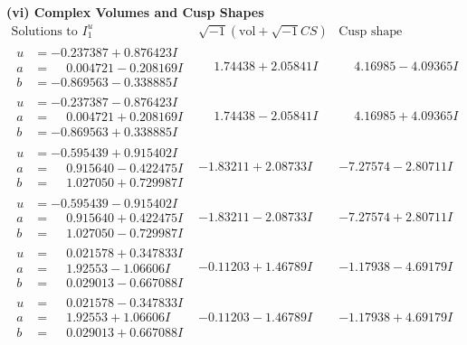 \documentclass[1p]{elsarticle_modified}
\theoremstyle{definition}
\newcommand{\I}{\sqrt{-1}}
\begin{document}
\newpage\flushleft \textbf{(vi) Complex Volumes and Cusp Shapes}
$$\begin{array}{c|c|c}  
\text{Solutions to }I^u_{1}& \I (\text{vol} + \sqrt{-1}CS) & \text{Cusp shape}\\
 \hline 
\begin{aligned}
u &= -0.237387 + 0.876423 I \\
a &= \phantom{-}0.004721 - 0.208169 I \\
b &= -0.869563 - 0.338885 I\end{aligned}
 & \phantom{-}1.74438 + 2.05841 I & \phantom{-}4.16985 - 4.09365 I \\ \hline\begin{aligned}
u &= -0.237387 - 0.876423 I \\
a &= \phantom{-}0.004721 + 0.208169 I \\
b &= -0.869563 + 0.338885 I\end{aligned}
 & \phantom{-}1.74438 - 2.05841 I & \phantom{-}4.16985 + 4.09365 I \\ \hline\begin{aligned}
u &= -0.595439 + 0.915402 I \\
a &= \phantom{-}0.915640 - 0.422475 I \\
b &= \phantom{-}1.027050 + 0.729987 I\end{aligned}
 & -1.83211 + 2.08733 I & -7.27574 - 2.80711 I \\ \hline\begin{aligned}
u &= -0.595439 - 0.915402 I \\
a &= \phantom{-}0.915640 + 0.422475 I \\
b &= \phantom{-}1.027050 - 0.729987 I\end{aligned}
 & -1.83211 - 2.08733 I & -7.27574 + 2.80711 I \\ \hline\begin{aligned}
u &= \phantom{-}0.021578 + 0.347833 I \\
a &= \phantom{-}1.92553 - 1.06606 I \\
b &= \phantom{-}0.029013 - 0.667088 I\end{aligned}
 & -0.11203 + 1.46789 I & -1.17938 - 4.69179 I \\ \hline\begin{aligned}
u &= \phantom{-}0.021578 - 0.347833 I \\
a &= \phantom{-}1.92553 + 1.06606 I \\
b &= \phantom{-}0.029013 + 0.667088 I\end{aligned}
 & -0.11203 - 1.46789 I & -1.17938 + 4.69179 I \\ \hline\begin{aligned}

\end{aligned}
\end{array}$$
\end{document}
